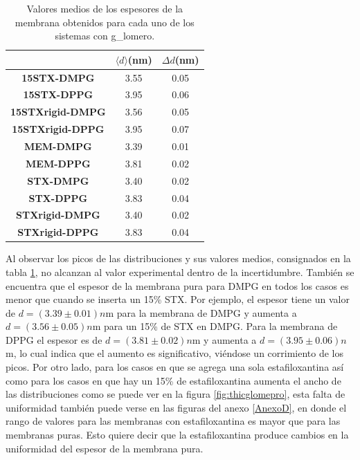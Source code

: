 \begin{table}
    \centering
\begin{tabular}{|c|c|c|}
\toprule
{} &  $\langle d\rangle$(nm) &  $\Delta d$(nm) \\
\midrule
\textbf{15STX-DMPG     } &            3.55 &        0.05 \\
\textbf{15STX-DPPG     } &            3.95 &        0.06 \\
\textbf{15STXrigid-DMPG} &            3.56 &        0.05 \\
\textbf{15STXrigid-DPPG} &            3.95 &        0.07 \\
\textbf{MEM-DMPG       } &            3.39 &        0.01 \\
\textbf{MEM-DPPG       } &            3.81 &        0.02 \\
\textbf{STX-DMPG       } &            3.40 &        0.02 \\
\textbf{STX-DPPG       } &            3.83 &        0.04 \\
\textbf{STXrigid-DMPG  } &            3.40 &        0.02 \\
\textbf{STXrigid-DPPG  } &            3.83 &        0.04 \\
\bottomrule
\end{tabular}
\caption{Valores medios de los espesores de la membrana obtenidos para cada uno de los sistemas con g\_lomero.}
    \label{tab:thickglomepro}
\end{table}
Al observar los picos de las distribuciones y sus valores medios, consignados en la tabla \ref{tab:thickglomepro}, no alcanzan al valor experimental dentro de la incertidumbre. Tambi\'{e}n se encuentra que el espesor de la membrana pura para DMPG en todos los casos es menor que cuando se inserta un 15\% STX. Por ejemplo, el espesor tiene un valor de $d=(3.39\pm0.01)n$m para la membrana de DMPG y aumenta a $d=(3.56\pm0.05)n$m para un 15\% de STX en DMPG. Para la membrana de DPPG el espesor es de $d=(3.81\pm0.02)n$m y aumenta a $d=(3.95\pm0.06)n$m, lo cual indica que el aumento es significativo, vi\'{e}ndose un corrimiento de los picos. Por otro lado, para los casos en que se agrega una sola estafiloxantina as\'{i} como para los casos en que hay un 15\% de estafiloxantina aumenta el ancho de las distribuciones como se puede ver en la figura \ref{fig:thicglomepro}, esta falta de uniformidad tambi\'{e}n puede verse en las figuras del anexo \ref{AnexoD}, en donde el rango de valores para las membranas con estafiloxantina es mayor que para las membranas puras. Esto quiere decir que la estafiloxantina produce cambios en la uniformidad del espesor de la membrana pura.\\


